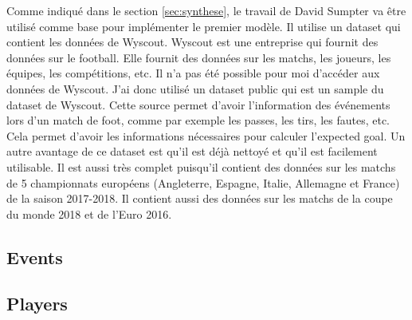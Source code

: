 \documentclass[12pt]{article}
\begin{document}
\noindent Comme indiqué dans le section \ref{sec:synthese}, le travail de David Sumpter \cite{sumpterFittingXGModel} va être utilisé comme base pour implémenter le premier modèle. Il utilise un dataset qui contient les données de Wyscout. Wyscout est une entreprise qui fournit des données sur le football. Elle fournit des données sur les matchs, les joueurs, les équipes, les compétitions, etc. Il n'a pas été possible pour moi d'accéder aux données de Wyscout. J'ai donc utilisé un dataset public qui est un sample du dataset de Wyscout. \cite{pappalardoPublicDataSet2019}
\newline
\noindent Cette source permet d'avoir l'information des événements lors d'un match de foot, comme par exemple les passes, les tirs, les fautes, etc. Cela permet d'avoir les informations nécessaires pour calculer l'expected goal. Un autre avantage de ce dataset est qu'il est déjà nettoyé et qu'il est facilement utilisable. Il est aussi très complet puisqu'il contient des données sur les matchs de 5 championnats européens (Angleterre, Espagne, Italie, Allemagne et France) de la saison 2017-2018. Il contient aussi des données sur les matchs de la coupe du monde 2018 et de l'Euro 2016.

\subsection{Events}

\subsection{Players}



\end{document}
